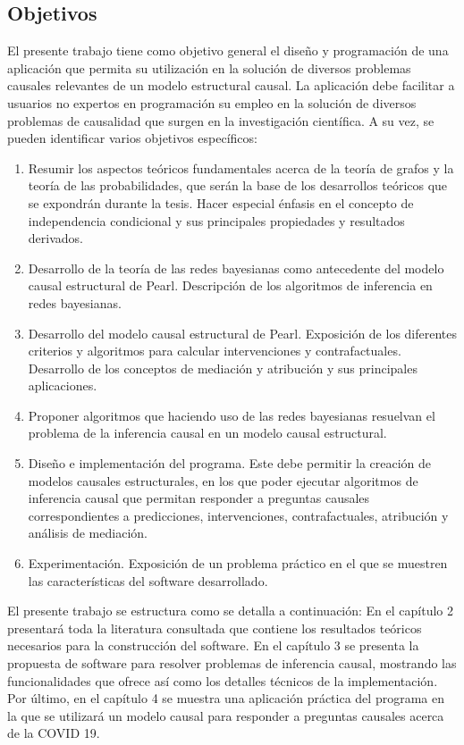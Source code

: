 \begin{introduction}
	\section{Objetivos}
	El presente trabajo tiene como objetivo general el diseño y programación de una aplicación que permita su utilización en la solución de diversos problemas causales relevantes de un modelo estructural causal. La aplicación debe facilitar a usuarios no expertos en programación su empleo en la solución de diversos problemas de causalidad que surgen en la investigación científica. A su vez, se pueden identificar varios objetivos específicos:	
	\begin{enumerate}
		\item Resumir los aspectos teóricos fundamentales acerca de la teoría de grafos y la teoría de las probabilidades, que serán la base de los desarrollos teóricos que se expondrán durante la tesis. Hacer especial énfasis en el concepto de independencia condicional y sus principales propiedades y resultados derivados.
		\item Desarrollo de la teoría de las redes bayesianas como antecedente del modelo causal estructural de Pearl. Descripción de los algoritmos de inferencia en redes bayesianas. 
		\item Desarrollo del modelo causal estructural de Pearl. Exposición de los diferentes criterios y algoritmos para calcular intervenciones y contrafactuales. Desarrollo de los conceptos de mediación y atribución y sus principales aplicaciones. 
		\item Proponer algoritmos que haciendo uso de las redes bayesianas resuelvan el problema de la inferencia causal en un modelo causal estructural.
		\item Diseño e implementación del programa. Este debe permitir la creación de modelos causales estructurales, en los que poder ejecutar algoritmos de inferencia causal que permitan responder a preguntas causales correspondientes a predicciones, intervenciones, contrafactuales, atribución y análisis de mediación.		
		\item Experimentación. Exposición de un problema práctico en el que se muestren las características del software desarrollado.
	\end{enumerate}
	
	El presente trabajo se estructura como se detalla a continuación: En el capítulo 2 presentará toda la literatura consultada que contiene los resultados teóricos necesarios para la construcción del software. En el capítulo 3 se presenta la propuesta de software para resolver problemas de inferencia causal, mostrando las funcionalidades que ofrece así como los detalles técnicos de la implementación. Por último, en el capítulo 4 se muestra una aplicación práctica del programa en la que se utilizará un modelo causal para responder a preguntas causales acerca de la COVID 19.
\end{introduction}

